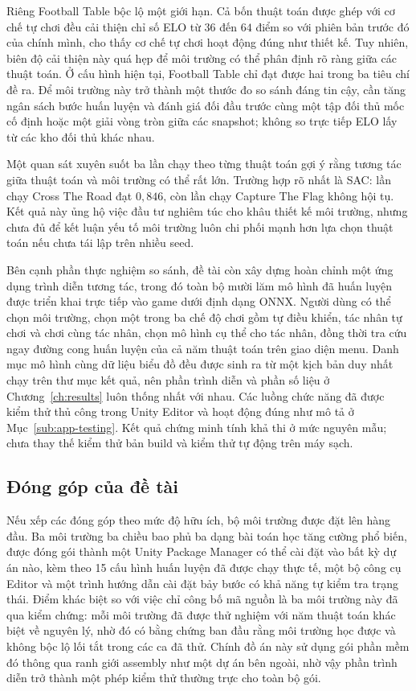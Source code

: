 \indent Riêng Football Table bộc lộ một giới hạn. Cả bốn
thuật toán được ghép với cơ chế tự chơi đều cải thiện chỉ số ELO từ $36$ đến $64$ điểm so
với phiên bản trước đó của chính mình, cho thấy cơ chế tự chơi hoạt động đúng như thiết
kế. Tuy nhiên, biên độ cải thiện này quá hẹp để môi trường có thể phân định rõ ràng giữa
các thuật toán. Ở cấu hình hiện tại, Football Table chỉ đạt được hai trong ba tiêu chí đề
ra. Để môi trường này trở thành một thước đo so sánh đáng tin cậy, cần tăng ngân sách bước
huấn luyện và đánh giá đối đầu trước cùng một tập đối thủ mốc cố định hoặc một giải vòng
tròn giữa các snapshot; không so trực tiếp ELO lấy từ các kho đối thủ khác nhau.

\indent Một quan sát xuyên suốt ba lần chạy theo từng thuật toán gợi ý rằng tương tác giữa
thuật toán và môi trường có thể rất lớn. Trường hợp rõ nhất là SAC: lần chạy Cross The Road
đạt $0{,}846$, còn lần chạy Capture The Flag không hội tụ. Kết quả này ủng hộ việc đầu tư
nghiêm túc cho khâu thiết kế môi trường, nhưng chưa đủ để kết luận yếu tố môi trường luôn
chi phối mạnh hơn lựa chọn thuật toán nếu chưa tái lập trên nhiều seed.

\indent Bên cạnh phần thực nghiệm so sánh, đề tài còn xây dựng hoàn chỉnh một ứng dụng
trình diễn tương tác, trong đó toàn bộ mười lăm mô hình đã huấn luyện được triển khai trực
tiếp vào game dưới định dạng ONNX. Người dùng có thể chọn môi trường, chọn một trong ba
chế độ chơi gồm tự điều khiển, tác nhân tự chơi và chơi cùng tác nhân, chọn mô hình cụ thể
cho tác nhân, đồng thời tra cứu ngay đường cong huấn luyện của cả năm thuật toán trên giao
diện menu. Danh mục mô hình cùng dữ liệu biểu đồ đều được sinh ra từ một kịch bản duy nhất
chạy trên thư mục kết quả, nên phần trình diễn và phần số liệu ở Chương~\ref{ch:results}
luôn thống nhất với nhau. Các luồng chức năng đã được kiểm thử thủ công trong Unity Editor
và hoạt động đúng như mô tả ở Mục~\ref{sub:app-testing}. Kết quả chứng minh tính khả thi ở
mức nguyên mẫu; chưa thay thế kiểm thử bản build và kiểm thử tự động trên máy sạch.

\subsection{Đóng góp của đề tài}
\indent Nếu xếp các đóng góp theo mức độ hữu ích, bộ môi trường được đặt lên hàng đầu. Ba
môi trường ba chiều bao phủ ba dạng bài toán học tăng cường phổ biến, được đóng gói thành
một Unity Package Manager có thể cài đặt vào bất kỳ dự án nào, kèm theo 15 cấu hình
huấn luyện đã được chạy thực tế, một bộ công cụ Editor và một trình hướng dẫn cài đặt bảy
bước có khả năng tự kiểm tra trạng thái. Điểm khác biệt so với việc chỉ công bố mã nguồn
là ba môi trường này đã qua kiểm chứng: mỗi môi trường đã được thử nghiệm với năm thuật
toán khác biệt về nguyên lý, nhờ đó có bằng chứng ban đầu rằng môi trường học được và không
bộc lộ lối tắt trong các ca đã thử. Chính đồ án này sử dụng gói phần mềm đó thông qua ranh giới
assembly như một dự án bên ngoài, nhờ vậy phần trình diễn trở thành một phép kiểm thử
thường trực cho toàn bộ gói.

